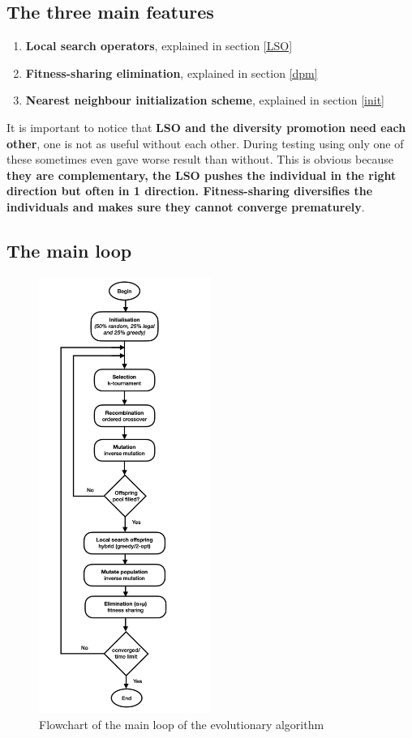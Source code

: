 \documentclass[a4paper,10pt]{article}
\begin{document}
\subsection{The three main features}
\begin{enumerate}
 \item \textbf{Local search operators}, explained in section \ref{LSO} 
 \item \textbf{Fitness-sharing elimination}, explained in section \ref{dpm} 
 \item \textbf{Nearest neighbour initialization scheme}, explained in section \ref{init} 
\end{enumerate}
It is important to notice that \textbf{LSO and the diversity promotion need each other}, one is not as useful without each other. During testing using only one of these sometimes even gave worse result than without. This is obvious because \textbf{they are complementary, the LSO pushes the individual in the right direction but often in 1 direction. Fitness-sharing diversifies the individuals and makes sure they cannot converge prematurely}.

\subsection{The main loop}
\begin{figure}[h]
\caption{Flowchart of the main loop of the evolutionary algorithm}
\centering
\includegraphics[width=0.5\textwidth]{flowchart.png}
\end{figure}
\end{document}

